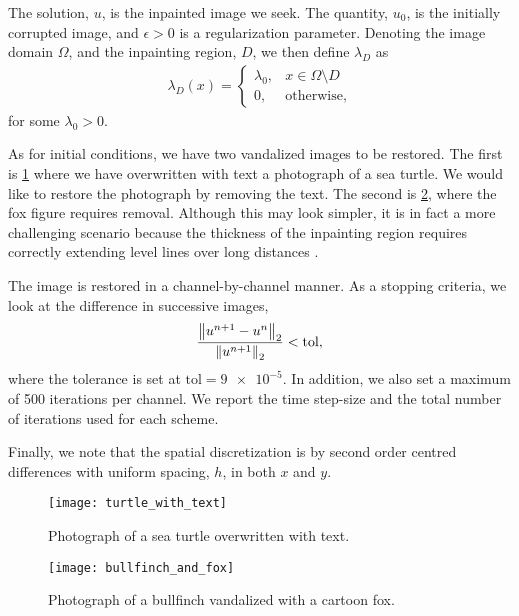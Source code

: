 The solution, $u$, is the inpainted image we seek. The quantity, $u_0$, is the initially corrupted image, and $\epsilon > 0$ is a regularization parameter. Denoting the image domain $\Omega$, and the inpainting region, $D$, we then define $\lambda_D$ as 
\begin{align}
\lambda_D(x)
= \begin{cases}
\lambda_0, & x\in \Omega\setminus D
\\
0, &\text{otherwise},
\end{cases}
\end{align}
for some $\lambda_0 > 0$.

As for initial conditions, we have two vandalized images to be restored. The first is \cref{fig:turtle with text} where we have overwritten with text a photograph of a sea turtle. We would like to restore the photograph by removing the text. The second is \cref{fig:bullfinch and fox}, where the fox figure requires removal. Although this may look simpler, it is in fact a more challenging scenario because the thickness of the inpainting region requires correctly extending level lines over long distances \cite{schonlieb2011unconditionally}.

The image is restored in a channel-by-channel manner. As a stopping criteria, we look at the difference in successive images, 
\begin{align}
        \frac{\left\lVert u^{n+1} - u^n\right\rVert_2}{\left\lVert u^{n+1}\right\rVert_2} < \mathrm{tol},
\end{align}
where the tolerance is set at $\mathrm{tol}=\num{9e-5}$.  In addition, we also set a maximum of 500 iterations per channel. We report the time step-size and the total number of iterations used for each scheme.

Finally, we note that the spatial discretization is by second order centred differences with uniform spacing, $h$, in both $x$ and $y$.
\begin{figure}[htb!]
        \centering 
\texttt{[image: turtle\_with\_text]}
\caption[Photograph of a sea turtle overwritten with text]{Photograph of a sea turtle overwritten with text.}
\label{fig:turtle with text}
\end{figure}

\begin{figure}[htb!]
        \centering 
\texttt{[image: bullfinch\_and\_fox]}
\caption[Photograph of a bullfinch vandalized by a cartoonish fox]{Photograph of a bullfinch vandalized with a cartoon fox.}
\label{fig:bullfinch and fox}
\end{figure}


